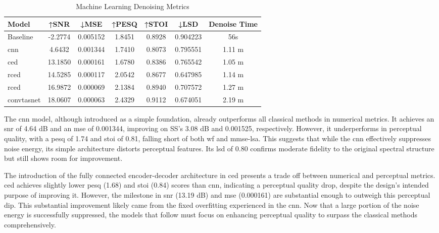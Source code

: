 \vspace{1em}
\begin{table}[H]
\centering
\caption{Machine Learning Denoising Metrics}
\label{tab:ml_denoise}
\begin{tabular}{|l|c|c|c|c|c|c|}
\hline
\textbf{Model} & \textbf{↑SNR} & \textbf{↓MSE} & \textbf{↑PESQ} & \textbf{↑STOI} & \textbf{↓LSD} & \textbf{Denoise Time} \\
\hline
Baseline     & -2.2774 & 0.005152 & 1.8451 & 0.8928 & 0.904223 & 56s \\
\gls{cnn}         & 4.6432  & 0.001344 & 1.7410 & 0.8073 & 0.795551 & 1.11 m \\
\gls{ced}         & 13.1850  & 0.000161 & 1.6780 & 0.8386 & 0.765542 & 1.05 m \\
\gls{rced}        & 14.5285  & 0.000117 & 2.0542 & 0.8677 & 0.647985 & 1.14 m \\
\gls{rced}        & 16.9872  & 0.000069 & 2.1384 & 0.8940 & 0.707572 & 1.27 m \\
\gls{convtasnet}  & 18.0607 & 0.000063 & 2.4329 & 0.9112 & 0.674051 & 2.19 m \\
\hline
\end{tabular}
\end{table}

The \gls{cnn} model, although introduced as a simple foundation, already outperforms all classical methods in numerical metrics. It achieves an \gls{snr} of 4.64 dB and an \gls{mse} of 0.001344, improving on SS’s 3.08 dB and 0.001525, respectively. However, it underperforms in perceptual quality, with a \gls{pesq} of 1.74 and \gls{stoi} of 0.81, falling short of both \gls{wf} and \gls{mmse-lsa}. This suggests that while the \gls{cnn} effectively suppresses noise energy, its simple architecture distorts perceptual features. Its \gls{lsd} of 0.80 confirms moderate fidelity to the original spectral structure but still shows room for improvement.

The introduction of the fully connected encoder-decoder architecture in \gls{ced} presents a trade off between numerical and perceptual metrics. \gls{ced} achieves slightly lower \gls{pesq} (1.68) and \gls{stoi} (0.84) scores than \gls{cnn}, indicating a perceptual quality drop, despite the design's intended purpose of improving it. However, the milestone in \gls{snr} (13.19 dB) and \gls{mse} (0.000161) are substantial enough to outweigh this perceptual dip. This substantial improvement likely came from the fixed overfitting experienced in the \gls{cnn}. Now that a large portion of the noise energy is successfully suppressed, the models that follow must focus on enhancing perceptual quality to surpass the classical methods comprehensively.

